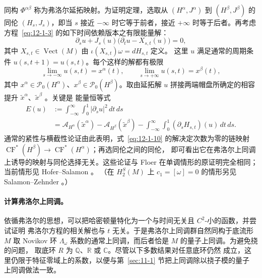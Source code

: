 同构 $\Phi^{\alpha\beta}$ 称为弗洛尔延拓映射。为证明定理，选取从
$(H^\alpha,J^\alpha)$ 到 $(H^\beta,J^\beta)$ 的同伦 $(H_s,J_s)$，即当 $s$ 接近
$-\infty$ 时它等于前者，接近 $+\infty$ 时等于后者。再考虑方程~\eqref{eq:12-1-3}
的如下时间依赖版本之有限能量解：
\begin{equation}\label{eq:12-1-10}
  \partial_su+J_s(u)\bigl(\partial_tu-X_{s,t}(u)\bigr)=0,
\end{equation}
其中 $X_{s,t}\in\operatorname{Vect}(M)$ 由 $\iota(X_{s,t})\omega=dH_{s,t}$ 定义。
这里 $u$ 满足通常的周期条件 $u(s,t+1)=u(s,t)$。每个这样的解都有极限
\[
  \lim_{s\to-\infty}u(s,t)=x^\alpha(t),\qquad
  \lim_{s\to+\infty}u(s,t)=x^\beta(t),
\]
其中 $x^\alpha\in\mathcal P_0(H^\alpha)$、$x^\beta\in\mathcal P_0(H^\beta)$。取由延拓解
$u$ 拼接两端帽盘所确定的相容提升 $\widetilde x^\alpha$、$\widetilde x^\beta$
。关键是
能量恒等式
\begin{equation}\label{eq:12-1-11}
\begin{aligned}
  E(u)&:=\int_{-\infty}^{\infty}\int_0^1|\partial_su|^2\,dt\,ds\\
  &=\mathcal A_{H^\alpha}(\widetilde x^\alpha)
  -\mathcal A_{H^\beta}(\widetilde x^\beta)
  -\int_{-\infty}^{\infty}\int_0^1(\partial_sH_{s,t})(u)\,dt\,ds.
\end{aligned}
\end{equation}
通常的紧性与横截性论证由此表明，式~\eqref{eq:12-1-10} 的解决定次数为零的链映射
$\operatorname{CF}^*(H^\beta)\to\operatorname{CF}^*(H^\alpha)$；再选同伦之间的同伦，
即可看出它在弗洛尔上同调上诱导的映射与同伦选择无关。这些论证与 Floer
 在单调情形的原证明完全相同；当前情形见 Hofer--Salamon 。
（在 $H_2^S(M)$ 上 $c_1=[\omega]=0$ 的情形另见 Salamon--Zehnder 。）

\paragraph{计算弗洛尔上同调。}
依循弗洛尔的思想，可以把哈密顿量特化为一个与时间无关且 $C^2$-小的函数，并尝试证明
弗洛尔方程的相关解也与 $t$ 无关。于是弗洛尔上同调群自然同构于底流形 $M$ 取 Novikov
环 $\Lambda_\omega$ 系数的通常上同调，而后者恰是 $M$ 的量子上同调。为避免挠的问题，
取底环 $R$ 为 $\mathbb Q$、$\mathbb R$ 或 $\mathbb C$。尽管以下多数结果对任意底环仍然
成立，这里仍限于特征零域上的系数，以便与第~\ref{sec:11-1} 节把上同调除以挠子模的量子
上同调做法一致。

